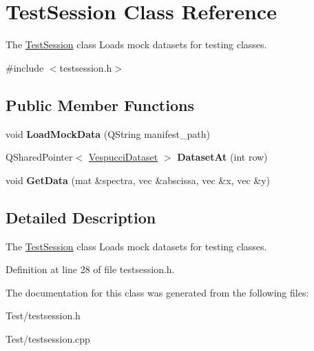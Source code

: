 \hypertarget{class_test_session}{}\section{Test\+Session Class Reference}
\label{class_test_session}


The \hyperlink{class_test_session}{Test\+Session} class Loads mock datasets for testing classes.  




{\ttfamily \#include $<$testsession.\+h$>$}

\subsection*{Public Member Functions}
\begin{DoxyCompactItemize}
\item 
void {\bfseries Load\+Mock\+Data} (Q\+String manifest\+\_\+path)\hypertarget{class_test_session_aee8a36c7d5a3d2f75f78cfdb695025c4}{}\label{class_test_session_aee8a36c7d5a3d2f75f78cfdb695025c4}

\item 
Q\+Shared\+Pointer$<$ \hyperlink{class_vespucci_dataset}{Vespucci\+Dataset} $>$ {\bfseries Dataset\+At} (int row)\hypertarget{class_test_session_af253273e86c514a6b40afa18b0ddb785}{}\label{class_test_session_af253273e86c514a6b40afa18b0ddb785}

\item 
void {\bfseries Get\+Data} (mat \&spectra, vec \&abscissa, vec \&x, vec \&y)\hypertarget{class_test_session_a9b3a5425d904c61dad54a6dd680538a6}{}\label{class_test_session_a9b3a5425d904c61dad54a6dd680538a6}

\end{DoxyCompactItemize}


\subsection{Detailed Description}
The \hyperlink{class_test_session}{Test\+Session} class Loads mock datasets for testing classes. 

Definition at line 28 of file testsession.\+h.



The documentation for this class was generated from the following files\+:\begin{DoxyCompactItemize}
\item 
Test/testsession.\+h\item 
Test/testsession.\+cpp\end{DoxyCompactItemize}
